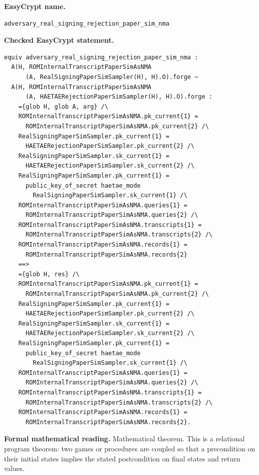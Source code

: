 \begin{formaltheorem}
\noindent\textbf{EasyCrypt name.}
\begin{lstlisting}[language=EasyCrypt,basicstyle=\ttfamily\scriptsize]
adversary_real_signing_rejection_paper_sim_nma
\end{lstlisting}
\noindent\textbf{Checked EasyCrypt statement.}
\begin{lstlisting}[language=EasyCrypt,basicstyle=\ttfamily\scriptsize]
equiv adversary_real_signing_rejection_paper_sim_nma :
  A(H, ROMInternalTranscriptPaperSimAsNMA
      (A, RealSigningPaperSimSampler(H), H).O).forge ~
  A(H, ROMInternalTranscriptPaperSimAsNMA
      (A, HAETAERejectionPaperSimSampler(H), H).O).forge :
    ={glob H, glob A, arg} /\
    ROMInternalTranscriptPaperSimAsNMA.pk_current{1} =
      ROMInternalTranscriptPaperSimAsNMA.pk_current{2} /\
    RealSigningPaperSimSampler.pk_current{1} =
      HAETAERejectionPaperSimSampler.pk_current{2} /\
    RealSigningPaperSimSampler.sk_current{1} =
      HAETAERejectionPaperSimSampler.sk_current{2} /\
    RealSigningPaperSimSampler.pk_current{1} =
      public_key_of_secret haetae_mode
        RealSigningPaperSimSampler.sk_current{1} /\
    ROMInternalTranscriptPaperSimAsNMA.queries{1} =
      ROMInternalTranscriptPaperSimAsNMA.queries{2} /\
    ROMInternalTranscriptPaperSimAsNMA.transcripts{1} =
      ROMInternalTranscriptPaperSimAsNMA.transcripts{2} /\
    ROMInternalTranscriptPaperSimAsNMA.records{1} =
      ROMInternalTranscriptPaperSimAsNMA.records{2}
    ==>
    ={glob H, res} /\
    ROMInternalTranscriptPaperSimAsNMA.pk_current{1} =
      ROMInternalTranscriptPaperSimAsNMA.pk_current{2} /\
    RealSigningPaperSimSampler.pk_current{1} =
      HAETAERejectionPaperSimSampler.pk_current{2} /\
    RealSigningPaperSimSampler.sk_current{1} =
      HAETAERejectionPaperSimSampler.sk_current{2} /\
    RealSigningPaperSimSampler.pk_current{1} =
      public_key_of_secret haetae_mode
        RealSigningPaperSimSampler.sk_current{1} /\
    ROMInternalTranscriptPaperSimAsNMA.queries{1} =
      ROMInternalTranscriptPaperSimAsNMA.queries{2} /\
    ROMInternalTranscriptPaperSimAsNMA.transcripts{1} =
      ROMInternalTranscriptPaperSimAsNMA.transcripts{2} /\
    ROMInternalTranscriptPaperSimAsNMA.records{1} =
      ROMInternalTranscriptPaperSimAsNMA.records{2}.
\end{lstlisting}
\noindent\textbf{Formal mathematical reading.}
Mathematical theorem. This is a relational program theorem: two games or procedures are coupled so that a precondition on their initial states implies the stated postcondition on final states and return values.


\end{formaltheorem}
